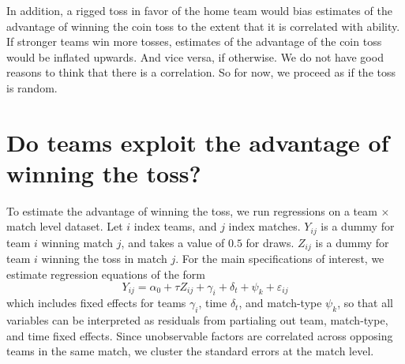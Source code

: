 \documentclass[11pt,  letterpaper]{article}
\begin{document}
In addition, a rigged toss in favor of the home team would bias estimates of the advantage of winning the coin toss to the extent that it is
correlated with ability. If stronger teams win more tosses, estimates of the advantage of the coin toss would be inflated upwards. And vice versa, if otherwise. We do not have good reasons to think that there is a correlation. So for now, we proceed as if the toss is random.












% 




\section{Do teams exploit the advantage of winning the toss?}

To estimate the advantage of winning the toss, we run regressions on a team $\times$ match level dataset. Let $i$ index teams, and $j$ index matches. $Y_{ij}$ is a dummy for team $i$ winning match $j$, and takes a value of $0.5$ for draws. $Z_{ij}$ is a dummy for team $i$ winning the toss in match $j$. For the main specifications of interest, we estimate regression equations of the form
\begin{equation}\label{eqn:reduced_form}
Y_{ij} = \alpha_0 + \tau Z_{ij} + \gamma_i + \delta_t +
\psi_k + \varepsilon_{ij}
\end{equation}
which includes fixed effects for teams $\gamma_i$, time $\delta_t$, and match-type $\psi_k$, so that all variables can be interpreted as residuals from partialing out team, match-type, and time fixed effects. Since unobservable factors are correlated across opposing teams in the same match, we cluster the standard errors at the match level.
\end{document}
